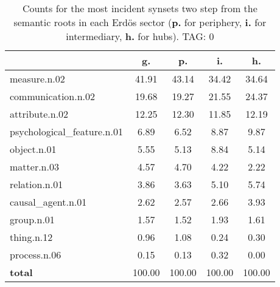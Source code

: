 \begin{table}[h!]
\begin{center}
\begin{tabular}{| l | c | c | c | c |}\hline
 & g. & p. & i. & h. \\\hline
measure.n.02 & 41.91  & 43.14  & 34.42  & 34.64 \\\hline
communication.n.02 & 19.68  & 19.27  & 21.55  & 24.37 \\\hline
attribute.n.02 & 12.25  & 12.30  & 11.85  & 12.19 \\\hline
psychological\_feature.n.01 & 6.89  & 6.52  & 8.87  & 9.87 \\\hline
object.n.01 & 5.55  & 5.13  & 8.84  & 5.14 \\\hline
matter.n.03 & 4.57  & 4.70  & 4.22  & 2.22 \\\hline
relation.n.01 & 3.86  & 3.63  & 5.10  & 5.74 \\\hline
causal\_agent.n.01 & 2.62  & 2.57  & 2.66  & 3.93 \\\hline
group.n.01 & 1.57  & 1.52  & 1.93  & 1.61 \\\hline
thing.n.12 & 0.96  & 1.08  & 0.24  & 0.30 \\\hline
process.n.06 & 0.15  & 0.13  & 0.32  & 0.00 \\\hline
{{\bf total}} & 100.00  & 100.00  & 100.00  & 100.00 \\\hline
\end{tabular}
\caption{Counts for the most incident synsets two step from the semantic roots in each Erd\"os sector ({\bf p.} for periphery, {\bf i.} for intermediary, {\bf h.} for hubs). TAG: 0}
\end{center}
\end{table}